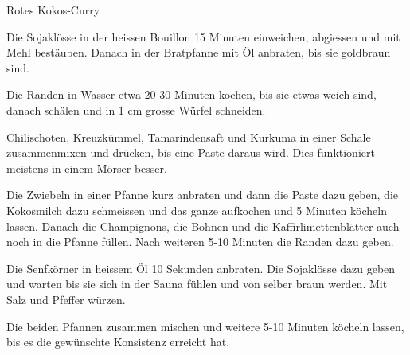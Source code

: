 
\begin{recipe}[]{Rotes Kokos-Curry}{}{}



\step
Die Sojakl\"osse in der heissen Bouillon 15 Minuten einweichen, abgiessen und mit Mehl best\"auben. Danach in der Bratpfanne mit \"Ol anbraten, bis sie goldbraun sind.

\step
Die Randen in Wasser etwa 20-30 Minuten kochen, bis sie etwas weich sind, danach sch\"alen und in 1 cm grosse W\"urfel schneiden.

\step
Chilischoten, Kreuzk\"ummel, Tamarindensaft und Kurkuma in einer Schale zusammenmixen und dr\"ucken, bis eine Paste daraus wird. Dies funktioniert meistens in einem M\"orser besser.

\step
Die Zwiebeln in einer Pfanne kurz anbraten und dann die Paste dazu geben, die Kokosmilch dazu schmeissen und das ganze aufkochen und 5 Minuten k\"ocheln lassen. Danach die Champignons, die Bohnen und die Kaffirlimettenbl\"atter auch noch in die Pfanne f\"ullen. Nach weiteren 5-10 Minuten die Randen dazu geben.


\step
Die Senfk\"orner in heissem \"Ol 10 Sekunden anbraten. Die Sojakl\"osse dazu geben und warten bis sie sich in der Sauna f\"uhlen und von selber braun werden. Mit Salz und Pfeffer w\"urzen.

\step
Die beiden Pfannen zusammen mischen und weitere 5-10 Minuten k\"ocheln lassen, bis es die gew\"unschte Konsistenz erreicht hat.


\end{recipe}